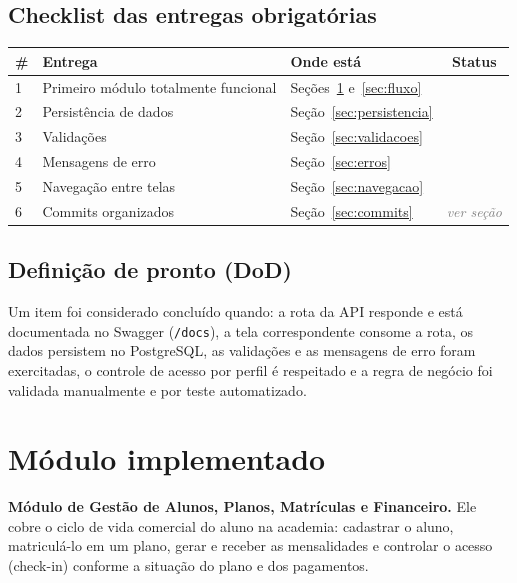 \documentclass[11pt,a4paper,final]{article}
\newcommand{\ok}{\textcolor{verde}{\ding{51}}}
\newcommand{\cod}[1]{\texttt{#1}}
\newcommand{\preencher}[1]{\textit{\textcolor{gray}{#1}}}
\begin{document}
\subsection{Checklist das entregas obrigatórias}

\begin{xltabular}{\textwidth}{l Y R{4.4cm} c}
  \toprule
  \textbf{\#} & \textbf{Entrega} & \textbf{Onde está} & \textbf{Status} \\
  \midrule
   & Primeiro módulo totalmente funcional & Seções~\ref{sec:modulo} e~\ref{sec:fluxo} & \ok \\
  2 & Persistência de dados                & Seção~\ref{sec:persistencia}  & \ok \\
  3 & Validações                           & Seção~\ref{sec:validacoes}    & \ok \\
  4 & Mensagens de erro                    & Seção~\ref{sec:erros}         & \ok \\
  5 & Navegação entre telas                & Seção~\ref{sec:navegacao}     & \ok \\
  6 & Commits organizados                  & Seção~\ref{sec:commits}       & \preencher{ver seção} \\
  \bottomrule
\end{xltabular}

\subsection{Definição de pronto (DoD)}

Um item foi considerado concluído quando: a rota da API responde e está documentada no Swagger
(\cod{/docs}), a tela correspondente consome a rota, os dados persistem no PostgreSQL, as validações e as
mensagens de erro foram exercitadas, o controle de acesso por perfil é respeitado e a regra de negócio foi
validada manualmente e por teste automatizado.

\section{Módulo implementado}\label{sec:modulo}

\textbf{Módulo de Gestão de Alunos, Planos, Matrículas e Financeiro.} Ele cobre o ciclo de vida
comercial do aluno na academia: cadastrar o aluno, matriculá-lo em um plano, gerar e receber as
mensalidades e controlar o acesso (check-in) conforme a situação do plano e dos pagamentos.
\end{document}
